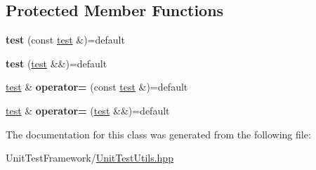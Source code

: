 \subsection*{Protected Member Functions}
\begin{DoxyCompactItemize}
\item 
\mbox{\label{classsequoia_1_1unit__testing_1_1test_a22ef7363cf63ceea18f9be114f321a9b}} 
{\bfseries test} (const \mbox{\hyperlink{classsequoia_1_1unit__testing_1_1test}{test}} \&)=default
\item 
\mbox{\label{classsequoia_1_1unit__testing_1_1test_a88f7d3023b644349e4d4348cf85771bf}} 
{\bfseries test} (\mbox{\hyperlink{classsequoia_1_1unit__testing_1_1test}{test}} \&\&)=default
\item 
\mbox{\label{classsequoia_1_1unit__testing_1_1test_ad288f679503ce2947681479fe5713cd1}} 
\mbox{\hyperlink{classsequoia_1_1unit__testing_1_1test}{test}} \& {\bfseries operator=} (const \mbox{\hyperlink{classsequoia_1_1unit__testing_1_1test}{test}} \&)=default
\item 
\mbox{\label{classsequoia_1_1unit__testing_1_1test_ac5e863e02c0af0972b04336857b8c2c0}} 
\mbox{\hyperlink{classsequoia_1_1unit__testing_1_1test}{test}} \& {\bfseries operator=} (\mbox{\hyperlink{classsequoia_1_1unit__testing_1_1test}{test}} \&\&)=default
\end{DoxyCompactItemize}


The documentation for this class was generated from the following file\+:\begin{DoxyCompactItemize}
\item 
Unit\+Test\+Framework/\mbox{\hyperlink{_unit_test_utils_8hpp}{Unit\+Test\+Utils.\+hpp}}\end{DoxyCompactItemize}
